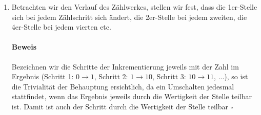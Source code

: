 \documentclass[a4paper,10pt]{article}
\begin{document}
\begin{enumerate}
\item   Betrachten wir den Verlauf des Zählwerkes, stellen wir fest, dass die 1er-Stelle sich bei jedem Zählschritt sich 
        ändert, die 2er-Stelle bei jedem zweiten, die 4er-Stelle bei jedem vierten etc. 
        \paragraph*{Beweis} Bezeichnen wir die Schritte der Inkrementierung jeweils mit der Zahl im Ergebnis (Schritt 1: $0 \to 1$, Schritt 2: $1 \to 10$, Schritt 3: $10 \to 11$, ...), so ist die Trivialität der Behauptung ersichtlich, da ein Umschalten jedesmal stattfindet, wenn das Ergebnis jeweils durch die Wertigkeit der Stelle teilbar ist. Damit ist auch der Schritt durch die Wertigkeit der Stelle teilbar \hfill $\square$
        

\end{enumerate}
\end{document}
